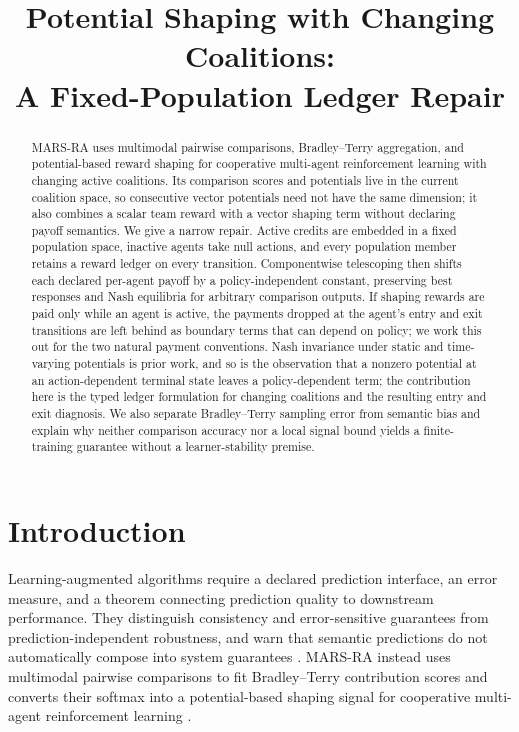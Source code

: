\documentclass{article}
\title{Potential Shaping with Changing Coalitions:\\A Fixed-Population Ledger Repair}
\author{}
\date{}
\begin{document}
\maketitle

\begin{abstract}
MARS-RA uses multimodal pairwise comparisons, Bradley--Terry aggregation, and potential-based reward shaping for cooperative multi-agent reinforcement learning with changing active coalitions. Its comparison scores and potentials live in the current coalition space, so consecutive vector potentials need not have the same dimension; it also combines a scalar team reward with a vector shaping term without declaring payoff semantics. We give a narrow repair. Active credits are embedded in a fixed population space, inactive agents take null actions, and every population member retains a reward ledger on every transition. Componentwise telescoping then shifts each declared per-agent payoff by a policy-independent constant, preserving best responses and Nash equilibria for arbitrary comparison outputs. If shaping rewards are paid only while an agent is active, the payments dropped at the agent's entry and exit transitions are left behind as boundary terms that can depend on policy; we work this out for the two natural payment conventions. Nash invariance under static and time-varying potentials is prior work, and so is the observation that a nonzero potential at an action-dependent terminal state leaves a policy-dependent term; the contribution here is the typed ledger formulation for changing coalitions and the resulting entry and exit diagnosis. We also separate Bradley--Terry sampling error from semantic bias and explain why neither comparison accuracy nor a local signal bound yields a finite-training guarantee without a learner-stability premise.
\end{abstract}

\section{Introduction}

Learning-augmented algorithms require a declared prediction interface, an error measure, and a theorem connecting prediction quality to downstream performance. They distinguish consistency and error-sensitive guarantees from prediction-independent robustness, and warn that semantic predictions do not automatically compose into system guarantees \cite{zhao2026learning}.
MARS-RA instead uses multimodal pairwise comparisons to fit Bradley--Terry contribution scores and converts their softmax into a potential-based shaping signal for cooperative multi-agent reinforcement learning \cite{wang2026marsra}.
\end{document}
